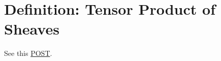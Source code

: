 \section{Definition: Tensor Product of Sheaves}

See this \href{https://math.stackexchange.com/questions/1488296/tensor-product-of-sheaves-is-not-a-sheaf}{POST}.

\begin{comment}
\subsection{A Counterexample by ChatGPT}

Let \( X = \mathbb{R} \) be the real line, and consider the following covering:
\[ U_1 = (-\infty, 1) \quad \text{and} \quad U_2 = (-1, \infty) \]

We define two sheaves:
\begin{itemize}
    \item $\mathcal{F}$ is the sheaf of continuous real-valued functions on $X$.
    \item $\mathcal{G}$ is the sheaf of bounded real-valued functions on $X$.
\end{itemize}
Now, let's define the presheaf $\mathcal{H}$ on $X$ as the tensor product presheaf $\mathcal{F} \otimes \mathcal{G}$, where:


Consider the continuous, bounded functions \( f_1(x) = e^x \) defined on \( U_1 \) and \( f_2(x) = e^{-x} \) defined on \( U_2 \). These functions agree on the intersection \( U_1 \cap U_2 = \emptyset \).

However, if we attempt to glue these functions together to form a candidate section \( s \) over \( X \), we encounter a problem. Since \( f_1(x) \) and \( f_2(x) \) have different behaviors on the intervals \( U_1 \) and \( U_2 \), respectively, there is no continuous, bounded function that can extend both \( f_1(x) \) and \( f_2(x) \) over the entire real line \( X \).
\end{comment}